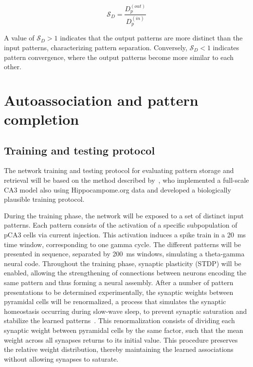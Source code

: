 \begin{equation}
    \label{eq:sd}
    \mathcal{S}_D = \frac{D_p^{(out)}}{D_p^{(in)}}
\end{equation}

A value of $\mathcal{S}_D > 1$ indicates that the output patterns are more distinct than the input patterns, characterizing
pattern separation. Conversely, $\mathcal{S}_D < 1$ indicates pattern convergence, where the output patterns become more
similar to each other.

\section{Autoassociation and pattern completion}

\subsection{Training and testing protocol}\label{sec:protocolo_treinamento_teste}

The network training and testing protocol for evaluating pattern storage and retrieval will be based on the method described
by~\textcite{kopsickFormation2024}, who implemented a full-scale CA3 model also using Hippocampome.org data and developed a
biologically plausible training protocol.

During the training phase, the network will be exposed to a set of distinct input patterns. Each pattern consists of the
activation of a specific subpopulation of pCA3 cells via current injection. This activation induces a spike train in a
\SI{20}{\milli\second} time window, corresponding to one gamma cycle. The different patterns will be presented in sequence,
separated by \SI{200}{\milli\second} windows, simulating a theta-gamma neural code. Throughout the training phase, synaptic
plasticity (STDP) will be enabled, allowing the strengthening of connections between neurons encoding the same pattern and thus
forming a neural assembly. After a number of pattern presentations to be determined experimentally, the synaptic weights between
pyramidal cells will be renormalized, a process that simulates the synaptic homeostasis occurring during slow-wave sleep, to
prevent synaptic saturation and stabilize the learned patterns~\parencite{gonzalez-ruedaActivityDependent2018, kopsickFormation2024}.
This renormalization consists of dividing each synaptic weight between pyramidal cells by the same factor, such that the mean
weight across all synapses returns to its initial value. This procedure preserves the relative weight distribution, thereby
maintaining the learned associations without allowing synapses to saturate.

